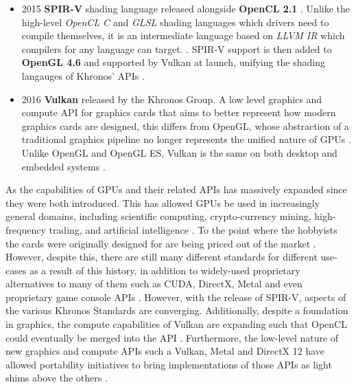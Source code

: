 \documentclass[a4paper,12pt,twoside,openright]{report}
\begin{document}
\begin{itemize}
    \item 2015 \textbf{SPIR-V} shading language released alongside
    \textbf{OpenCL 2.1} \cite{SPIRVLaunch}. Unlike the high-level
    \textit{OpenCL C} and \textit{GLSL} shading languages which drivers need to
    compile themselves, it is an intermediate language based on \textit{LLVM
    IR} which compilers for any language can target. \cite{LLVMIR}
    \cite{SPIRV}. SPIR-V support is then added to \textbf{OpenGL 4.6} and
    supported by Vulkan at launch, unifying the shading langauges of Khronos'
    APIs \cite{SPIRVOpenGL}.

    \item 2016 \textbf{Vulkan} released by the Khronos Group. A low level
    graphics and compute API for graphics cards that aims to better represent
    how modern graphics cards are designed, this differs from OpenGL, whose
    abstraction of a traditional graphics pipeline no longer represents the
    unified nature of GPUs \cite{VulkanAnnouncement}. Unlike OpenGL and OpenGL
    ES, Vulkan is the same on both desktop and embedded systems \cite{Vulkan}.

\end{itemize}


As the capabilities of GPUs and their related APIs has massively expanded since
they were both introduced. This has allowed GPUs be used in increasingly
general domains, including scientific computing, crypto-currency mining,
high-frequency trading, and artificial intelligence \cite{GPUCrypto}
\cite{GPUScientificComputing} \cite{GPUTrading} \cite{GPUAI}. To the point
where the hobbyists the cards were originally designed for are being priced out
of the market \cite{GPUCrypto}. However, despite this, there are still many
different standards for different use-cases as a result of this history, in
addition to widely-used proprietary alternatives to many of them such as CUDA,
DirectX, Metal and even proprietary game console APIs \cite{CUDA} \cite{Metal}
\cite{Direct3D} \cite{PS4PortCrew}. However, with the release of SPIR-V,
aspects of the various Khronos Standards are converging. Additionally, despite
a foundation in graphics, the compute capabilities of Vulkan are expanding such
that OpenCL could eventually be merged into the API \cite{VulkanOpenCLMerge}.
Furthermore, the low-level nature of new graphics and compute APIs such a
Vulkan, Metal and DirectX 12 have allowed portability initiatives to bring
implementations of those APIs as light shims above the others
\cite{VulkanPortabilityInitiative}
\cite{VulkanPortabilityInitiativeAnnouncement}.
\end{document}
